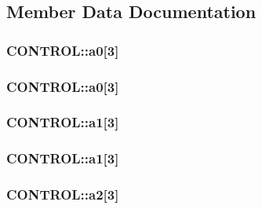 \subsection{Member Data Documentation}
\hypertarget{struct_c_o_n_t_r_o_l_a21c35b9c8affece31c265592dbcdf865}{
\subsubsection[{a0}]{ C\-O\-N\-T\-R\-O\-L\-::a0\mbox{[}3\mbox{]}}}\label{struct_c_o_n_t_r_o_l_a21c35b9c8affece31c265592dbcdf865}
\hypertarget{struct_c_o_n_t_r_o_l_aa098da46058df64fd45fc82b146e930e}{
\subsubsection[{a0}]{ C\-O\-N\-T\-R\-O\-L\-::a0\mbox{[}3\mbox{]}}}\label{struct_c_o_n_t_r_o_l_aa098da46058df64fd45fc82b146e930e}
\hypertarget{struct_c_o_n_t_r_o_l_a7b74681b819bcc11475d0e623c55d762}{
\subsubsection[{a1}]{ C\-O\-N\-T\-R\-O\-L\-::a1\mbox{[}3\mbox{]}}}\label{struct_c_o_n_t_r_o_l_a7b74681b819bcc11475d0e623c55d762}
\hypertarget{struct_c_o_n_t_r_o_l_a68b10e0fea87327b946bb52643a4bfbc}{
\subsubsection[{a1}]{ C\-O\-N\-T\-R\-O\-L\-::a1\mbox{[}3\mbox{]}}}\label{struct_c_o_n_t_r_o_l_a68b10e0fea87327b946bb52643a4bfbc}
\hypertarget{struct_c_o_n_t_r_o_l_ac6987a96eab38548ed11e6b7cf3a69d6}{
\subsubsection[{a2}]{ C\-O\-N\-T\-R\-O\-L\-::a2\mbox{[}3\mbox{]}}}\label{struct_c_o_n_t_r_o_l_ac6987a96eab38548ed11e6b7cf3a69d6}
